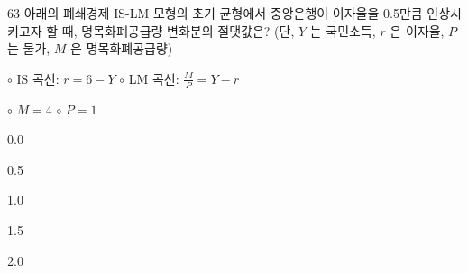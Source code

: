 \begin{question}{63}
아래의 폐쇄경제 IS-LM 모형의 초기 균형에서 중앙은행이 이자율을 0.5만큼 인상시키고자 할 때, 명목화폐공급량 변화분의 절댓값은? (단, $Y$ 는 국민소득, $r$ 은 이자율, $P$ 는 물가, $M$ 은 명목화폐공급량)
\begin{framedtext}
$\circ$ IS 곡선: $r=6-Y$ \qquad $\circ$ LM 곡선: $\frac{M}{P}=Y-r$ \par
$\circ$ $M=4$ \qquad\qquad\qquad $\circ$ $P=1$
\end{framedtext}
\begin{choices}
  \item 0.0
  \item 0.5
  \item 1.0
  \item 1.5
  \item 2.0
\end{choices}
\end{question}
